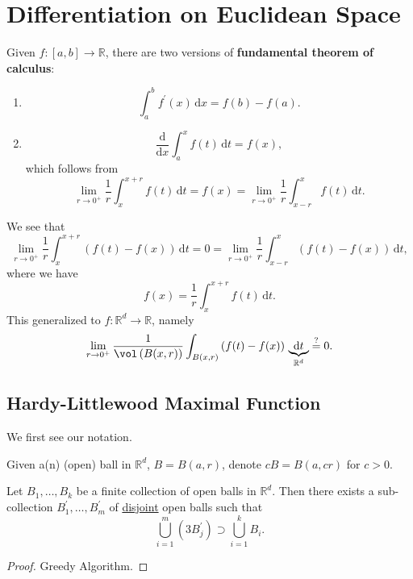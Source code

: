 \chapter{Differentiation on Euclidean Space}\label{ch:Differentiation-on-Euclidean-Space}
\begin{prev}
	Given \(f\colon [a, b]\to \mathbb{R} \), there are two versions of \textbf{fundamental theorem of calculus}:
	\begin{enumerate}[(1)]
		\item
		      \[
			      \int_{a}^{b} f^\prime (x) \,\mathrm{d}x = f(b) - f(a).
		      \]
		\item
		      \[
			      \frac{\mathrm{d}}{\mathrm{d}x} \int_{a}^{x} f(t) \,\mathrm{d}t = f(x),
		      \]
		      which follows from
		      \[
			      \lim\limits_{r \to 0^+} \frac{1}{r}\int_{x}^{x+r} f(t) \,\mathrm{d}t = f(x) = \lim\limits_{r \to 0^+} \frac{1}{r}\int_{x-r}^{x} f(t) \,\mathrm{d}t.
		      \]
	\end{enumerate}
\end{prev}
\begin{remark}
	We see that
	\[
		\lim\limits_{r \to 0^+} \frac{1}{r}\int_{x}^{x+r} \left(f(t)-f(x)\right) \,\mathrm{d}t = 0 = \lim\limits_{r \to 0^+} \frac{1}{r}\int_{x-r}^{x} \left(f(t)-f(x)\right) \,\mathrm{d}t,
	\]
	where we have
	\[
		f(x) = \frac{1}{r}\int_{x}^{x+r} f(t) \,\mathrm{d}t.
	\]
	This generalized to \(f\colon \mathbb{R} ^d\to \mathbb{R} \), namely
	\[
		\lim\limits_{r \to 0^+} \frac{1}{\vol \left(B(x, r)\right)}\int_{B(x, r)}\left(f(t)-f(x)\right)\,\underbrace{\mathrm{d}t}_{\mathbb{R} ^d} \overset{?}{=} 0.
	\]
\end{remark}
\section{Hardy-Littlewood Maximal Function}
We first see our notation.
\begin{notation}
	Given a(n) (open) ball in \(\mathbb{R} ^d\), \(B = B(a, r)\), denote \(cB = B(a, cr)\) for \(c>0\).
\end{notation}

\begin{lemma}\label{lma:Vitali-type-covering-lemma}
	Let \(B_1, \dots , B_k \) be a finite collection of open balls in \(\mathbb{R} ^d\). Then there
	exists a sub-collection \(B^\prime _1, \dots , B^\prime _m \) of \underline{disjoint} open balls such that
	\[
		\bigcup\limits_{i=1}^{m} \left(3 B_{j} ^\prime \right)\supset \bigcup\limits_{i=1}^{k} B_{i}.
	\]
\end{lemma}
\begin{proof}
	Greedy Algorithm.
\end{proof}